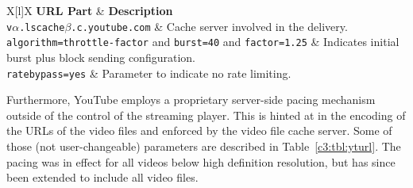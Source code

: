 \begin{table}[htb]
\caption{Transmission related parameters from YouTube's video URL setup.}
\label{c3:tbl:yturl}
	\centering
	\begin{tabu}{X[l]X}
		\toprule
		\textbf{\gls{URL} Part} & \textbf{Description} \\ 
		\midrule
		\texttt{v$\alpha$.lscache$\beta$.c.youtube.com} &  Cache server involved in the delivery.\\
		\texttt{algorithm=throttle-factor} and \texttt{burst=40} and \texttt{factor=1.25} & Indicates initial burst plus block sending configuration. \\
		\texttt{ratebypass=yes} & Parameter to indicate no rate limiting.\\
		\bottomrule
	\end{tabu}
\end{table}

Furthermore, YouTube employs a proprietary server-side pacing mechanism outside of the control of the streaming player. This is hinted at in the encoding of the \glspl{URL} of the video files and enforced by the video file cache server. Some of those (not user-changeable) parameters are described in Table~\ref{c3:tbl:yturl}. The pacing was in effect for all videos below high definition resolution, but has since been extended to include all video files. 

